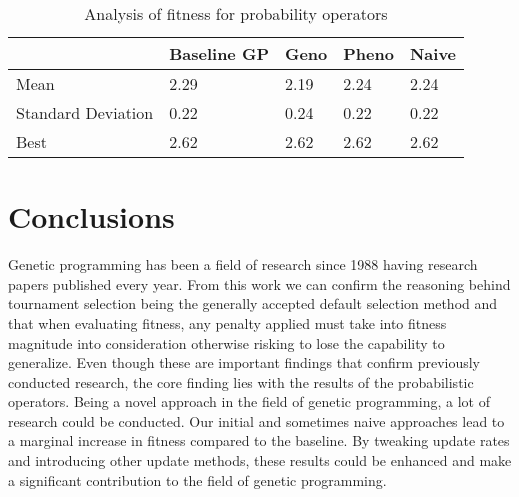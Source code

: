 \documentclass[12pt]{article}
\begin{document}
\vspace*{30px}
\begin{table}[h!]
\centering
\begin{tabular}{l || l l l l}
 \hline
  & Baseline GP & Geno & Pheno & Naive   \\ [0.5ex]
 \hline\hline
 Mean & \cellcolor{red!25}2.29 & 	\cellcolor{green!25}2.19 & 	2.24 & 2.24 \\
 Standard Deviation & 0.22 & 0.24 & 0.22 & 0.22\\
 Best & 2.62 & 2.62 & 2.62 & 2.62 \\
 \hline
\end{tabular}
\caption{Analysis of fitness for probability operators}
\label{table_others}
\end{table}

\section*{Conclusions}
Genetic programming has been a field of research since 1988 \cite{Koza} having research papers published every year. From this work we can confirm the reasoning behind tournament selection being the generally accepted default selection method and that when evaluating fitness, any penalty applied must take into fitness magnitude into consideration otherwise risking to lose the capability to generalize. Even though these are important findings that confirm previously conducted research, the core finding lies with the results of the probabilistic operators. Being a novel approach in the field of genetic programming, a lot of research could be conducted. Our initial and sometimes naive approaches lead to a marginal increase in fitness compared to the baseline. By tweaking update rates and introducing other update methods, these results could be enhanced and make a significant contribution to the field of genetic programming.\hfill \break
\end{document}
